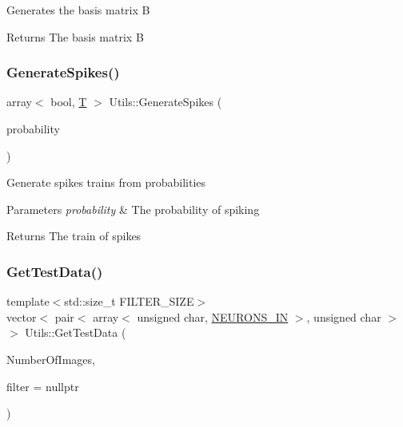 Generates the basis matrix B \begin{DoxyReturn}{Returns}
The basis matrix B 
\end{DoxyReturn}
\mbox{\label{class_utils_afc5341fe29fd49c62f4a5c1940a09531}} 
\subsubsection{\texorpdfstring{Generate\+Spikes()}{GenerateSpikes()}}
{\footnotesize\ttfamily array$<$ bool, \mbox{\hyperlink{_constants_8h_a6108cec236ef7a2e1d3259931de87186}{T}} $>$ Utils\+::\+Generate\+Spikes (\begin{DoxyParamCaption}\item[{float}]{probability }\end{DoxyParamCaption})\hspace{0.3cm}{\ttfamily [static]}}

Generate spikes trains from probabilities 
\begin{DoxyParams}{Parameters}
{\em probability} & The probability of spiking \\
\hline
\end{DoxyParams}
\begin{DoxyReturn}{Returns}
The train of spikes 
\end{DoxyReturn}
\mbox{\label{class_utils_a2b2c5d01544dc05c20a7b91c80cc1d96}} 
\subsubsection{\texorpdfstring{Get\+Test\+Data()}{GetTestData()}}
{\footnotesize\ttfamily template$<$std\+::size\+\_\+t F\+I\+L\+T\+E\+R\+\_\+\+S\+I\+ZE$>$ \\
vector$<$ pair$<$ array$<$ unsigned char, \mbox{\hyperlink{_constants_8h_aefc2426e4681da445c7793c98a83c532}{N\+E\+U\+R\+O\+N\+S\+\_\+\+IN}} $>$, unsigned char $>$ $>$ Utils\+::\+Get\+Test\+Data (\begin{DoxyParamCaption}\item[{int}]{Number\+Of\+Images,  }\item[{array$<$ unsigned char, F\+I\+L\+T\+E\+R\+\_\+\+S\+I\+ZE $>$ $\ast$}]{filter = {\ttfamily nullptr} }\end{DoxyParamCaption})\hspace{0.3cm}{\ttfamily [static]}}

